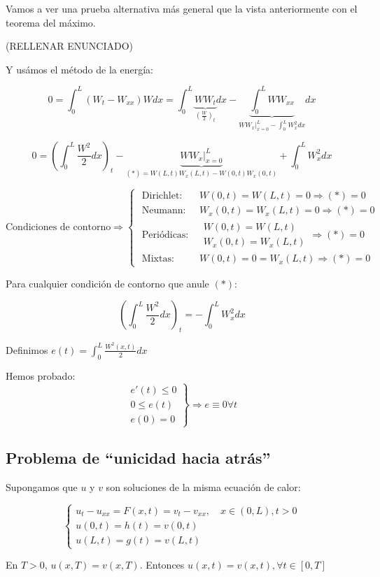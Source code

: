 	 	Vamos a ver una prueba alternativa más general que la vista anteriormente con el teorema del máximo.

	 	(RELLENAR ENUNCIADO)

	 	Y usámos el método de la energía:

	 	\[ 0 = \int_0^L (W_t-W_{xx}) W dx = \int_0^L \underbrace{W W_t}_{(\frac{W}{2})_t} dx - \underbrace{\int_0^L W W_{xx}}_{W W_x |_{x=0}^L - \int_0^L W^2_x dx} dx  \]

	 	\[ 0 = \left(\int_0^L \frac{W^2}{2}dx\right)_t - \underbrace{\left. W W_x \right|_{x=0}^L}_{(*)=W(L,t)W_x(L,t)-W(0,t)W_x(0,t)} + \int_0^L W^2_x dx \]

	 	\[\text{Condiciones de contorno} \Rightarrow \begin{cases}
	 		\text{ Dirichlet: } &W(0,t) = W(L,t) = 0 \Rightarrow (*) = 0\\
	 		\text{ Neumann: } &W_x(0,t) = W_x(L,t) = 0 \Rightarrow (*) = 0\\
	 		\text{ Periódicas: } &\begin{array}{l}
	 			W(0,t) = W(L,t) \\
	 			W_x(0,t) = W_x(L,t)
	 			\end{array} \Rightarrow (*) = 0 \\
	 		\text{ Mixtas: } &W(0,t) = 0 = W_x(L,t) \Rightarrow (*) = 0
	 	\end{cases}\]

	 	Para cualquier condición de contorno que anule $(*)$:

	 	\[\left( \int_0^L \frac{W^2}{2} dx \right)_t = - \int_0^L W^2_x dx \]

	 	Definimos $e(t) = \int_0^L \frac{W^2(x,t)}{2}dx$

	 	Hemos probado:
	 	\[\left.\begin{array}{r}
	 		e'(t) \leq 0 \\
	 		0 \leq e(t) \\
	 		e(0) = 0
	 	\end{array}\right\} \Rightarrow e \equiv 0 \forall t\]


	 \subsection{Problema de ``unicidad hacia atrás''}

	 	\begin{theorem}

		 	Supongamos que $u$ y $v$ son soluciones de la misma ecuación de calor:

		 	\[\begin{cases}
		 		u_t - u_{xx} = F(x,t) = v_t - v_{xx}, \quad x \in (0,L), t > 0 \\
		 		u(0,t) = h(t) = v(0,t) \\
		 		u(L,t) = g(t) = v(L,t)
		 	\end{cases}\]

		 	En $T > 0$, $u(x,T) = v(x,T)$. Entonces $u(x,t) = v(x,t), \forall t \in [0,T]$

		\end{theorem}

